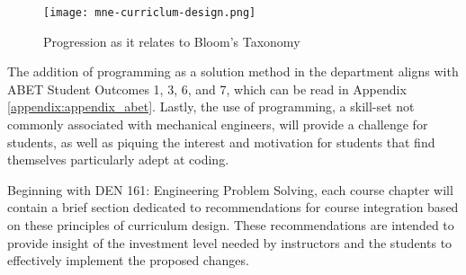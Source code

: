 \begin{figure}
    \texttt{[image: mne-curriclum-design.png]}
    \caption{Progression as it relates to Bloom's Taxonomy}
    \label{revised-bloom-taxonomy}
\end{figure}

The addition of programming as a solution method in the department aligns with ABET 
Student Outcomes 1, 3, 6, and 7, which can be read in Appendix \ref{appendix:appendix_abet}.
Lastly, the use of programming, a skill-set not commonly associated with mechanical
engineers, will provide a challenge for students, as well as piquing the interest and 
motivation for students that find themselves particularly adept at coding.

Beginning with DEN 161: Engineering Problem Solving, each course chapter will contain
a brief section dedicated to recommendations for course integration based on these
principles of curriculum design. These recommendations are intended to provide insight
of the investment level needed by instructors and the students to effectively 
implement the proposed changes.